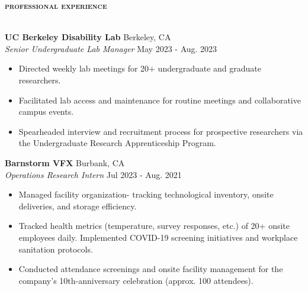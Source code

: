 \documentclass[a4paper]{article}
\newcommand{\lineunder} {
    \vspace*{-8pt} \\
    \hspace*{-18pt} \hrulefill \\
}
\newcommand{\header} [1] {
    {\hspace*{-18pt}\vspace*{6pt} \large{\textbf{\textsc{\MakeLowercase{#1}}}}}
    \vspace*{-6pt}\lineunder
}
\begin{document}
\vspace{1mm}
\header{Professional Experience}
\vspace{2mm}

\textbf{UC Berkeley Disability Lab} \hfill Berkeley, CA\\
\textit{Senior Undergraduate Lab Manager} \hfill May 2023 - Aug. 2023\\
\vspace{-1mm}
\begin{itemize} \itemsep 1pt
\setlength\itemsep{0pt}  %
	\setlength\parskip{0pt}  %
	\setlength\parsep{0pt}  %
	\setlength\leftskip{0pt}  %
	\renewcommand\labelitemi{\tiny$\bullet$} %
	\item Directed weekly lab meetings for 20+ undergraduate and graduate researchers.
        \item Facilitated lab access and maintenance for routine meetings and collaborative campus events.
        \item Spearheaded interview and recruitment process for prospective researchers via the Undergraduate Research Apprenticeship Program.
        
\end{itemize}
\textbf{Barnstorm VFX} \hfill Burbank, CA\\
\textit{Operations Research Intern} \hfill Jul 2023 - Aug. 2021\\
\vspace{-1mm}
\begin{itemize} \itemsep 1pt
\setlength\itemsep{0pt}  %
	\setlength\parskip{0pt}  %
	\setlength\parsep{0pt}  %
	\setlength\leftskip{0pt}  %
	\renewcommand\labelitemi{\tiny$\bullet$} %
	\item Managed facility organization- tracking technological inventory, onsite deliveries, and storage efficiency.
        \item Tracked health metrics (temperature, survey responses, etc.) of 20+ onsite employees daily.  Implemented COVID-19 screening initiatives and workplace sanitation protocols.
        \item Conducted attendance screenings and onsite facility management for the company’s 10th-anniversary celebration (approx. 100 attendees).
\end{itemize}
\end{document}
